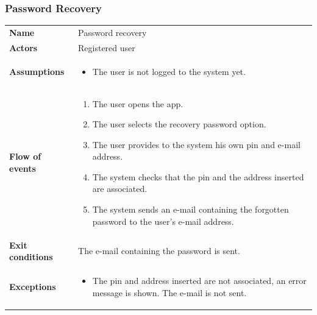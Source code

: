 \documentclass[english]{article}
\begin{document}
		\subsubsection{Password Recovery}
		\begin{center}
		\begin{tabular}{l||p{10cm}}
		\textbf{Name} 
			& Password recovery\\ [8px]
		\textbf{Actors} 
			& Registered user\\ [8px]
		\textbf{Assumptions} 
			& \begin{itemize}
				\item The user is not logged to the system yet.
			\end{itemize}\\
		\textbf{Flow of events}
			& \begin{enumerate}
	 			\item The user opens the app.
				\item The user selects the recovery password option.
				\item The user provides to the system his own pin and e-mail address.
				\item The system checks that the pin and the address inserted are associated.
				\item The system sends an e-mail containing the forgotten password to the user's e-mail address.
			\end{enumerate}\\ 
		\textbf{Exit conditions}
			& The e-mail containing the password is sent.\\ [8px]
		\textbf{Exceptions}
			& \begin{itemize}
				\item The pin and address inserted are not associated, an error message is shown. The e-mail is not sent.
			\end{itemize}
		\end{tabular}
		\end{center}
		\vspace*{\fill}
		\noindent
\end{document}
